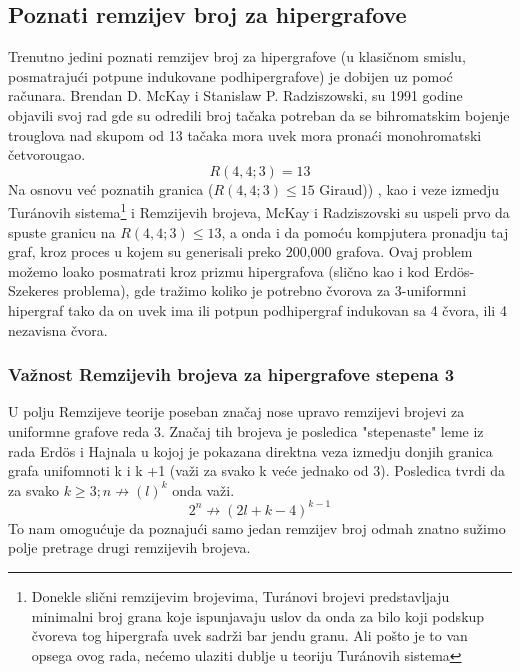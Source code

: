 \documentclass[a4paper]{article}
\begin{document}
	\subsection{Poznati remzijev broj za hipergrafove}%
	Trenutno jedini poznati remzijev broj za hipergrafove (u klasičnom smislu, posmatrajući potpune indukovane podhipergrafove)\cite{pregled}%
	 je dobijen uz pomoć računara. Brendan D. McKay i Stanislaw P. Radziszowski, su 1991 godine objavili svoj rad \textcite{HGremzibroj} gde su odredili broj tačaka potreban da se bihromatskim bojenje trouglova nad skupom od 13 tačaka mora uvek mora pronaći monohromatski četvorougao.%
	\begin{equation}
		R(4, 4; 3) = 13
	\end{equation}
	Na osnovu već poznatih granica ($R(4, 4; 3) \leq 15$ Giraud))%
	, kao i veze izmedju Tur\'{a}novih sistema\footnote{Donekle slični remzijevim brojevima, Tur\'{a}novi brojevi predstavljaju minimalni broj grana koje  ispunjavaju uslov da onda za bilo koji podskup čvoreva tog hipergrafa uvek sadrži bar jendu granu. Ali pošto je to van opsega ovog rada, nećemo ulaziti dublje u teoriju Tur\'{a}novih sistema } i Remzijevih brojeva, McKay i Radziszovski su uspeli prvo da spuste granicu na $R(4, 4; 3) \leq 13$, a onda i da pomoću kompjutera pronadju taj graf, kroz proces u kojem su generisali preko 200,000 grafova. Ovaj problem možemo loako posmatrati kroz prizmu hipergrafova (slično kao i kod Erd\"{o}s-Szekeres problema), gde tražimo koliko je potrebno čvorova za 3-uniformni hipergraf tako da on uvek ima ili potpun podhipergraf indukovan sa 4 čvora, ili 4  nezavisna čvora. %
	\subsubsection{Važnost Remzijevih brojeva za hipergrafove stepena 3}
	U polju Remzijeve teorije poseban značaj nose upravo remzijevi brojevi za uniformne grafove reda 3. Značaj tih brojeva je posledica "stepenaste" leme iz rada Erd\"{o}s i Hajnala \cite{posledice3remzi} %
	 u kojoj je pokazana direktna veza izmedju donjih granica grafa unifomnoti k i k +1 (važi za svako k veće jednako od 3). Posledica tvrdi da za svako $k \geq 3; n \not\rightarrow (l)^k$ onda važi. \cite{matoraknjigajedvanadjena}
	\begin{equation}
		2^n \not\rightarrow (2l + k - 4)^{k-1}
	\end{equation}
	To nam omogućuje da poznajući samo jedan remzijev broj odmah znatno sužimo polje pretrage drugi remzijevih brojeva.
\end{document}
